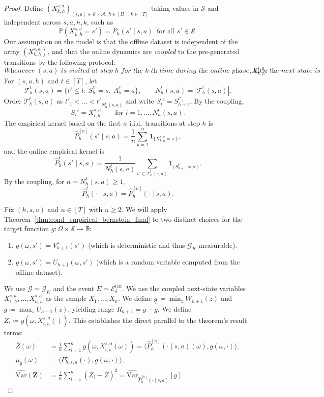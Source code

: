 \documentclass[twoside]{article}
\newcommand{\lowv}{W} %
\newcommand{\highv}{U} %
\begin{document}
\begin{proof}
Define $(X_{k,h}^{s,a})_{(s,a)\in\mathcal S\times\mathcal A,\ h\in[H],\ k\in[T]}$ taking values in $\mathcal S$ and independent across $s,a,h,k$, such as
  \[
  \mathbb{P}(X_{k,h}^{s,a}=s')=P_h(s'\mid s,a)\ \text{ for all }s'\in\mathcal S.
  \]
Our assumption on the model is that the offline dataset is independent of the array $(X_{k,h}^{s,a})$, and that the online dynamics are \emph{coupled} to the pre-generated transitions by the following protocol:
\[
\textit{Whenever $(s,a)$ is visited at step $h$ for the $k$-th time during the online phase, then the next state is } X_{k,h}^{s,a}.
\]
For $(s,a,h)$ and $t\in[T]$, let
\[
\mathcal T_h^t(s,a)=\{t'\le t:\ S_h^{t'}=s,\ A_h^{t'}=a\},\qquad
N_h^t(s,a)=|\mathcal T_h^t(s,a)|.
\]
Order $\mathcal T_h^t(s,a)$ as $t'_1<\dots<t'_{N_h^t(s,a)}$ and write $S_i'=S_{h+1}^{t'_i}$. By the coupling,
\[
S_i'=X_{i,h}^{s,a}\qquad\text{for }i=1,\dots,N_h^t(s,a).
\]
The empirical kernel based on the first $n$ i.i.d. transitions at step $h$ is
\[
\widehat P_h^{[n]}(s'\mid s,a)=\frac1n\sum_{k=1}^n\mathbf 1_{\{X_{k,h}^{s,a}=s'\}},
\]
and the online empirical kernel is
\[
\widehat P_h^{t}(s'\mid s,a)=\frac{1}{N_h^t(s,a)}\sum_{t'\in\mathcal T_h^t(s,a)}\mathbf 1_{\{S_{h+1}^{t'}=s'\}}.
\]
By the coupling, for $n=N_h^t(s,a)\ge1$,
\[
\widehat P_h^{t}(\cdot\mid s,a)=\widehat P_h^{[n]}(\cdot\mid s,a).
\]

Fix $(h,s,a)$ and $n \in [T]$ with $n \ge 2$. We will apply  Theorem~\ref{thm:cond_empirical_bernstein_final} to two distinct choices for the target function $g: \Omega \times \mathcal{S} \to \mathbb{R}$:
\begin{enumerate}
    \item $g(\omega, s') = V_{h+1}^\star(s')$ (which is deterministic and thus $\mathcal{G}_K$-measurable).
    \item $g(\omega, s') = \highv_{h+1}(\omega, s')$ (which is a random variable computed from the offline dataset).
\end{enumerate}
We use $\mathcal{G} = \mathcal{G}_K$ and the event $E = \mathcal{E}^{\mathrm{Off}}_\delta$.
We use the coupled next-state variables $X_{1,h}^{s,a}, \dots, X_{n,h}^{s,a}$ as the sample $X_1, \dots, X_n$.
We define $\underline{g} \coloneqq \min_{z} \lowv_{h+1}(z)$ and $\overline{g} \coloneqq \max_{z} \highv_{h+1}(z)$, yielding range $R_{h+1} = \overline{g} - \underline{g}$.
We define $Z_i \coloneqq g(\omega, X_{i,h}^{s,a}())$. This establishes the direct parallel to the theorem's result terms:
    \begin{align*}
        \overline{Z}(\omega) &= \frac{1}{n}\sum_{i=1}^n g(\omega, X_{i,h}^{s,a}(\omega)) = \langle \widehat{P}_h^{[n]}(\cdot\mid s,a)(\omega), g(\omega,\cdot) \rangle, \\
        \mu_g(\omega) &= \langle P_{h,s,a}^\star(\cdot), g(\omega,\cdot) \rangle, \\
        \widehat{\mathrm{Var}}(\mathbf{Z}) &= \frac{1}{n}\sum_{i=1}^n (Z_i - \overline{Z})^2 = \widehat{\mathrm{Var}}_{\widehat{P}_h^{[n]}(\cdot\mid s,a)}[g]
    \end{align*}


\end{proof}
\end{document}
